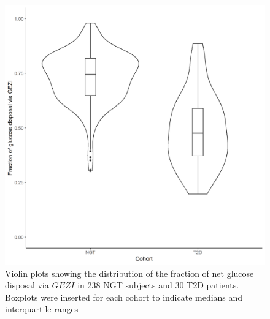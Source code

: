 \documentclass[utf8]{frontiersSCNS} %
\begin{document}
\begin{figure}[h!]
\begin{center}
\includegraphics[width=15cm]{frac_IVGTT.PNG}
\end{center}
\caption{Violin plots showing the distribution of the fraction of net glucose disposal via $GEZI$ in 238 NGT subjects and 30 T2D patients. Boxplots were inserted for each cohort to indicate medians and interquartile ranges}
\label{fig: frac}
\end{figure}

\end{document}
